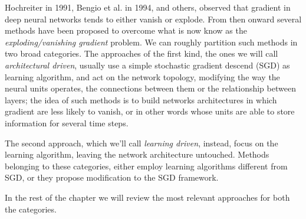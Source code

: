 
Hochreiter\cite{lstm} in 1991, Bengio et al.\cite{learningIsDifficult} in 1994, and others, observed that gradient in 
deep neural networks tends to either vanish or explode. From then onward several methods have been proposed to 
overcome what is now know as the \textit{exploding/vanishing gradient} problem. We can roughly partition such methods in 
two broad categories.
The approaches of the first kind, the ones we will call \textit{architectural driven}, usually use a simple stochastic gradient descend (SGD) as learning algorithm, and act on the network topology, modifying the way the 
neural units operates, the connections between them or the relationship between layers; the idea of such methods is to 
build networks architectures in which gradient are less likely to vanish, or in other words whose units are able to 
store information for several time steps.

The second approach, which we'll call \textit{learning driven}, instead, focus on the learning algorithm, leaving the 
network architecture untouched. Methods belonging to these categories, either employ learning algorithms different from SGD, or they propose modification to the SGD framework.

In the rest of the chapter we will review the most relevant approaches for both the categories.
